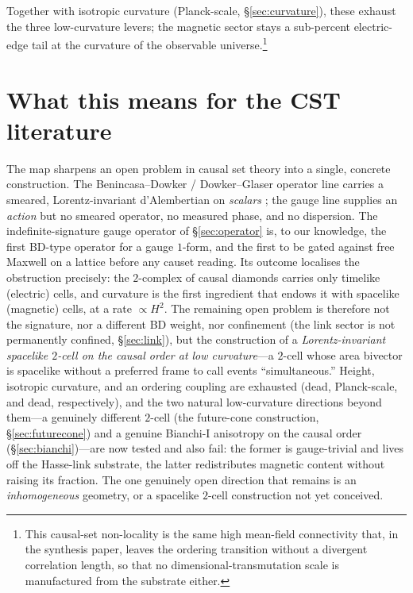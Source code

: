 \documentclass[aps,prd,reprint,nofootinbib,superscriptaddress,floatfix]{revtex4-2}
\begin{document}
Together with isotropic curvature (Planck-scale, \S\ref{sec:curvature}), these exhaust the
three low-curvature levers; the magnetic sector stays a sub-percent electric-edge tail at
the curvature of the observable universe.\footnote{This causal-set non-locality is the same
high mean-field connectivity that, in the synthesis paper, leaves the ordering transition
without a divergent correlation length, so that no dimensional-transmutation scale is
manufactured from the substrate either.}

\section{What this means for the CST literature}\label{sec:cst}

The map sharpens an open problem in causal set theory into a single, concrete
construction. The Benincasa--Dowker / Dowker--Glaser operator line carries a smeared,
Lorentz-invariant d'Alembertian on \emph{scalars}
\cite{BenincasaDowker2010,DowkerGlaser2013,BelenchiaBenincasaDowker2016}; the gauge line
\cite{Sverdlov2008,SverdlovBombelli2009} supplies an \emph{action} but no smeared
operator, no measured phase, and no dispersion. The indefinite-signature gauge operator
of \S\ref{sec:operator} is, to our knowledge, the first BD-type operator for a gauge
$1$-form, and the first to be gated against free Maxwell on a lattice before any causet
reading. Its outcome localises the obstruction precisely: the $2$-complex of causal
diamonds carries only timelike (electric) cells, and curvature is the first ingredient
that endows it with spacelike (magnetic) cells, at a rate $\propto H^2$. The remaining
open problem is therefore not the signature, nor a different BD weight, nor confinement
(the link sector is not permanently confined, \S\ref{sec:link}), but the construction of
a \emph{Lorentz-invariant spacelike $2$-cell on the causal order at low curvature}---a
$2$-cell whose area bivector is spacelike without a preferred frame to call events
``simultaneous.'' Height, isotropic curvature, and an ordering coupling are exhausted
(dead, Planck-scale, and dead, respectively), and the two natural low-curvature directions
beyond them---a genuinely different $2$-cell (the future-cone construction,
\S\ref{sec:futurecone}) and a genuine Bianchi-I anisotropy on the causal order
(\S\ref{sec:bianchi})---are now tested and also fail: the former is gauge-trivial and lives
off the Hasse-link substrate, the latter redistributes magnetic content without raising its
fraction. The one genuinely open direction that remains is an \emph{inhomogeneous} geometry,
or a spacelike $2$-cell construction not yet conceived.
\end{document}
